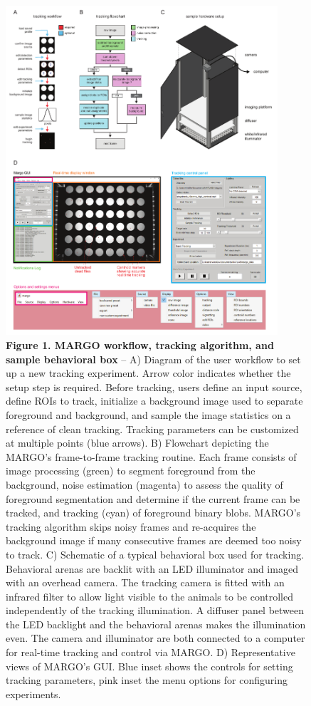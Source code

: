 \documentclass[10pt]{article}
\begin{document}
\newpage
\begin{figure}[h!]
	\begin{center}
		\includegraphics[width=0.9\textwidth]{../figures/autotracker_overview.pdf}
	\end{center}
	\caption*{\footnotesize \textbf{Figure 1. MARGO workflow, tracking algorithm, and sample behavioral box} -- A) Diagram of the user workflow to set up a new tracking experiment. Arrow color indicates whether the setup step is required. Before tracking, users define an input source, define ROIs to track, initialize a background image used to separate foreground and background, and sample the image statistics on a reference of clean tracking. Tracking parameters can be customized at multiple points (blue arrows). B) Flowchart depicting the MARGO's frame-to-frame tracking routine. Each frame consists of image processing (green) to segment foreground from the background, noise estimation (magenta) to assess the quality of foreground segmentation and determine if the current frame can be tracked, and tracking (cyan) of foreground binary blobs. MARGO's tracking algorithm skips noisy frames and re-acquires the background image if many consecutive frames are deemed too noisy to track. C) Schematic of a typical behavioral box used for tracking. Behavioral arenas are backlit with an LED illuminator and imaged with an overhead camera. The tracking camera is fitted with an infrared filter to allow light visible to the animals to be controlled independently of the tracking illumination. A diffuser panel between the LED backlight and the behavioral arenas makes the illumination even. The camera and illuminator are both connected to a computer for real-time tracking and control via MARGO. D) Representative views of MARGO's GUI. Blue inset shows the controls for setting tracking parameters, pink inset the menu options for configuring experiments.}
\end{figure}
\end{document}
